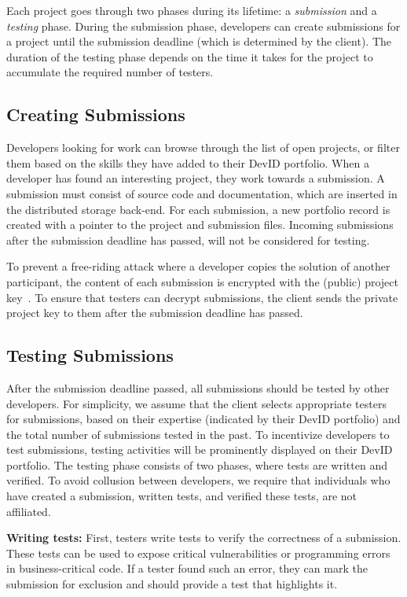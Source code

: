 Each project goes through two phases during its lifetime: a \emph{submission} and a \emph{testing} phase.
During the submission phase, developers can create submissions for a project until the submission deadline (which is determined by the client).
The duration of the testing phase depends on the time it takes for the project to accumulate the required number of testers.

\subsection{Creating Submissions}
\label{subsec:create_submissions}
Developers looking for work can browse through the list of open projects, or filter them based on the skills they have added to their DevID portfolio.
When a developer has found an interesting project, they work towards a submission.
A submission must consist of source code and documentation, which are inserted in the distributed storage back-end.
For each submission, a new portfolio record is created with a pointer to the project and submission files.
Incoming submissions after the submission deadline has passed, will not be considered for testing.

To prevent a free-riding attack where a developer copies the solution of another participant, the content of each submission is encrypted with the (public) project key~\cite{zhang2015keep}.
To ensure that testers can decrypt submissions, the client sends the private project key to them after the submission deadline has passed.

\subsection{Testing Submissions}
\label{subsec:review_submissions}
After the submission deadline passed, all submissions should be tested by other developers.
For simplicity, we assume that the client selects appropriate testers for submissions, based on their expertise (indicated by their DevID portfolio) and the total number of submissions tested in the past.
To incentivize developers to test submissions, testing activities will be prominently displayed on their DevID portfolio.
The testing phase consists of two phases, where tests are written and verified.
To avoid collusion between developers, we require that individuals who have created a submission, written tests, and verified these tests, are not affiliated.

\textbf{Writing tests:}
First, testers write tests to verify the correctness of a submission.
These tests can be used to expose critical vulnerabilities or programming errors in business-critical code.
If a tester found such an error, they can mark the submission for exclusion and should provide a test that highlights it.

